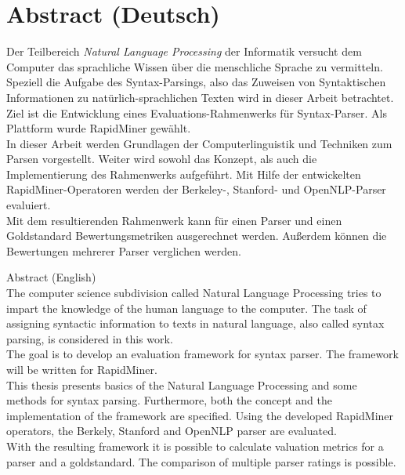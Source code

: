 %
\chapter*{Abstract (Deutsch)}
\label{sec:abstract}
\vspace*{-10mm}

Der Teilbereich \textit{Natural Language Processing} der Informatik versucht dem Computer das sprachliche Wissen über die menschliche Sprache zu vermitteln. Speziell die Aufgabe des Syntax-Parsings, also das Zuweisen von Syntaktischen Informationen zu natürlich-sprachlichen Texten wird in dieser Arbeit betrachtet. \\
Ziel ist die Entwicklung eines Evaluations-Rahmenwerks für Syntax-Parser. Als Plattform wurde RapidMiner gewählt.\\
In dieser Arbeit werden Grundlagen der Computerlinguistik und Techniken zum Parsen vorgestellt. Weiter wird sowohl das Konzept, als auch die Implementierung des Rahmenwerks aufgeführt. Mit Hilfe der entwickelten RapidMiner-Operatoren werden der Berkeley-, Stanford- und OpenNLP-Parser evaluiert.\\
Mit dem resultierenden Rahmenwerk kann für einen Parser und einen Goldstandard Bewertungsmetriken ausgerechnet werden. Außerdem können die Bewertungen mehrerer Parser verglichen werden.
\vspace*{20mm}

{Abstract (English)}\label{sec:abstract-diff} \\

The computer science subdivision called Natural Language Processing tries to impart the knowledge of the human language to the computer. The task of assigning syntactic information to texts in natural language, also called syntax parsing, is considered in this work.\\
The goal is to develop an evaluation framework for syntax parser. The framework will be written for RapidMiner.\\
This thesis presents basics of the Natural Language Processing and some methods for syntax parsing. Furthermore, both the concept and the implementation of the framework are specified. Using the developed RapidMiner operators, the Berkely, Stanford and OpenNLP parser are evaluated.\\
With the resulting framework it is possible to calculate valuation metrics for a parser and a goldstandard. The comparison of multiple parser ratings is possible.